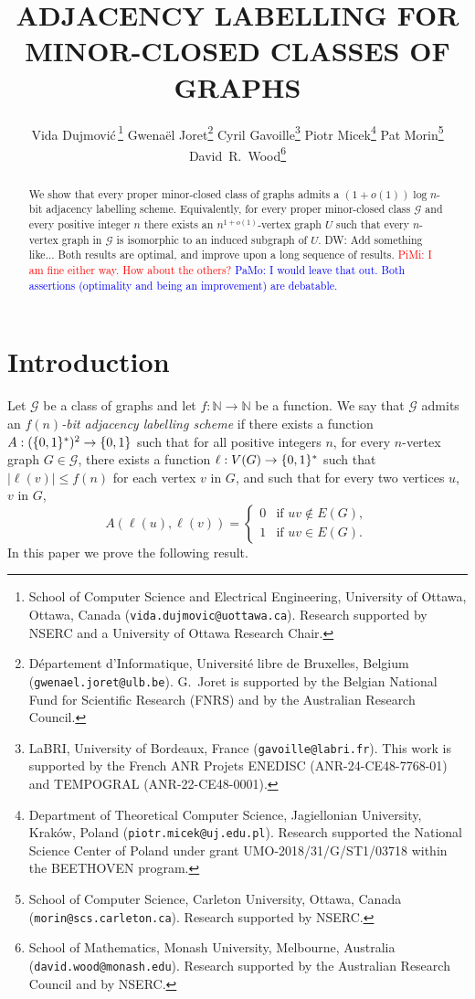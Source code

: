 \documentclass{patmorin}
\title{\MakeUppercase{\boldmath  Adjacency labelling for minor-closed classes of graphs}}
\author{
 Vida Dujmovi{\'c}\,\footnote{School of Computer Science and Electrical Engineering, University of Ottawa, Ottawa, Canada (\texttt{vida.dujmovic@uottawa.ca}). Research supported by NSERC and a University of Ottawa Research Chair.}
 \qquad
 Gwena\"el Joret\footnote{D\'epartement d'Informatique, Universit\'e libre de Bruxelles, Belgium ({\tt gwenael.joret@ulb.be}). G.\ Joret is supported by the Belgian National Fund for Scientific Research (FNRS) and by the Australian Research Council.}
 \qquad
 Cyril Gavoille\footnote{LaBRI, University of Bordeaux, France (\texttt{gavoille@labri.fr}). This work is supported by the French ANR Projets ENEDISC (ANR-24-CE48-7768-01) and TEMPOGRAL (ANR-22-CE48-0001).}\qquad
 Piotr Micek\footnote{Department of Theoretical Computer Science, Jagiellonian University, Kraków, Poland (\texttt{piotr.micek@uj.edu.pl}). Research supported
 the National Science Center of Poland under grant UMO-2018/31/G/ST1/03718 within the BEETHOVEN program.}
 \qquad
 Pat Morin\footnote{School of Computer Science, Carleton University, Ottawa, Canada (\texttt{morin@scs.carleton.ca}). Research supported by NSERC.}
 \qquad
 David~R.~Wood\footnote{School of Mathematics, Monash University, Melbourne, Australia (\texttt{david.wood@monash.edu}). Research supported by the Australian Research Council and by NSERC.}
 }
\date{}
\renewcommand{\leq}{\leqslant}
\newcommand{\david}[1]{{\color{orange} DW: #1}}
\newcommand{\pat}[1]{\textcolor{Blue}{PaMo: #1}}
\newcommand{\piotr}[1]{\textcolor{red}{PiMi: #1}}
\newcommand{\defin}[1]{\emph{\textcolor{brightmaroon}{#1}}}
\newcommand{\NN}{\mathbb{N}}
\newcommand{\calG}{\mathcal{G}}
\DeclarePairedDelimiter\set{\{}{\}}
\begin{document}
\maketitle



\begin{abstract}
We show that every proper minor-closed class of graphs admits
a $(1+o(1))\log n$-bit adjacency labelling scheme. Equivalently, for every proper minor-closed class $\mathcal{G}$ and every positive integer $n$ there exists an $n^{1+o(1)}$-vertex graph $U$ such that every $n$-vertex graph in $\mathcal{G}$ is isomorphic to an induced subgraph of $U$.
\david{Add something like... Both results are optimal, and improve upon a long sequence of results.}
\piotr{I am fine either way. How about the others?}  \pat{I would leave that out. Both assertions (optimality and being an improvement) are debatable.}
  \end{abstract}

  \newpage
  \tableofcontents

  \newpage
  \section{Introduction}
Let $\calG$ be a class of graphs and let $f:\NN\to\NN$ be a function.
We say that $\calG$ admits an \defin{$f(n)$-bit adjacency labelling scheme} if there exists a function $A:(\set{0,1}^*)^2\to\set{0,1}$
such that for all positive integers $n$, for every $n$-vertex graph $G\in\calG$, there exists a function $\ell: V(G)\to\set{0,1}^*$ such that
$|\ell(v)|\leq f(n)$ for each vertex $v$ in $G$, and such that
for every two vertices $u$, $v$ in $G$,
\[
A(\ell(u),\ell(v))=\begin{cases}
0&\textrm{if $uv\notin E(G)$},\\
1&\textrm{if $uv\in E(G)$}.
\end{cases}
\]
In this paper we prove the following result.
\end{document}
